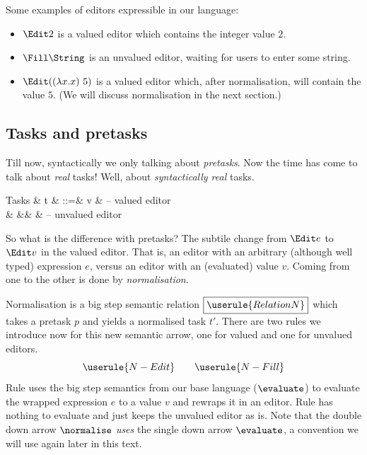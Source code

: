 Some examples of editors expressible in our language:
\begin{itemize}
  \item $\Edit 2$ is a valued editor which contains the integer value $2$.
  \item $\Fill \String$ is an unvalued editor,
    waiting for users to enter some string.
  \item $\Edit ((\lambda x . x)\ 5)$ is a valued editor which,
    after normalisation, will contain the value $5$.
    (We will discuss normalisation in the next section.)
\end{itemize}


\subsection{Tasks and pretasks}
\label{sec:tasks-vs-pretasks}

Till now, syntactically we only talking about \emph{pretasks}.
Now the time has come to talk about \emph{real} tasks!
Well, about \emph{syntactically real} tasks.
\begin{grammar}
  Tasks
    & t & ::=& \Edit v     & – valued editor \\
    &   &\mid& \Fill \beta & – unvalued editor \\
\end{grammar}

So what is the difference with pretasks?
The subtile change from $\Edit e$ to $\Edit v$ in the valued editor.
That is, an editor with an arbitrary (although well typed) expression $e$,
versus an editor with an (evaluated) value $v$.
Coming from one to the other is done by \emph{normalisation}.

Normalisation is a big step semantic relation $\boxed{\userule{RelationN}}$ which takes a pretask $p$
and yields a normalised task $t'$.
There are two rules we introduce now for this new semantic arrow,
one for valued and one for unvalued editors.
\begin{equation*}
  \userule{N-Edit} \qquad \userule{N-Fill}
\end{equation*}
Rule  uses the big step semantics from our base language ($\evaluate$)
to evaluate the wrapped expression $e$ to a value $v$ and rewraps it in an editor.
Rule  has nothing to evaluate and just keeps the unvalued editor as is.
Note that the double down arrow $\normalise$ \emph{uses} the single down arrow $\evaluate$,
a convention we will use again later in this text.

